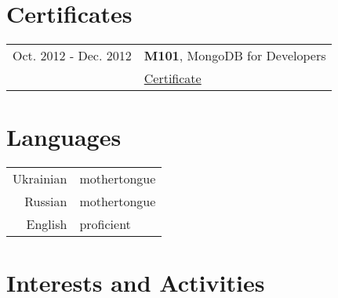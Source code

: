 \documentclass[a4paper,10pt]{article}
\begin{document}
 \section{Certificates}
 \begin{tabular}{rl}
  Oct. 2012 - Dec. 2012 & \textbf{M101}, MongoDB for Developers\\
  & \href{https://s3.amazonaws.com/edu-cert.10gen.com/downloads/8381fb4e8cff46cc82353a3ecea5a070/Certificate.pdf}{Certificate} \\	
 \end{tabular}

 \section{Languages}
 \begin{tabular}{rl}
  Ukrainian & mothertongue \\
  Russian & mothertongue \\
  English & proficient \\
 \end{tabular}

\section{Interests and Activities}
\end{document}
